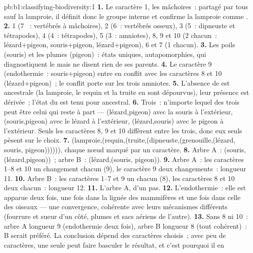 \begin{solution}{pb:b1:classifying-biodiversity:1}
\textbf{1.} Le caractère 1, les mâchoires~: partagé par tous sauf la
lamproie, il définit donc le groupe interne et confirme la lamproie
comme .
\textbf{2.} 1 (7 ~: vertébrés à mâchoires), 2 (6~: vertébrés
osseux), 3 (5~: dipneuste et tétrapodes), 4 (4~: tétrapodes), 5 (3~:
amniotes), 8, 9 et 10 (2 chacun~: lézard+pigeon, souris+pigeon,
lézard+pigeon), 6 et 7 (1 chacun).
\textbf{3.} Les poils (souris) et les plumes (pigeon)~: états uniques,
autapomorphies, qui diagnostiquent le  mais ne disent rien de ses
parents.
\textbf{4.} Le caractère 9 (endothermie~: souris+pigeon) entre en
conflit avec les caractères 8 et 10 (lézard+pigeon)~; le conflit porte
sur les trois amniotes.
\textbf{5.} L'absence de  est ancestrale (la lamproie, le requin
et la truite en sont dépourvus), leur présence est dérivée~; l'état du
 est tenu pour ancestral.
\textbf{6.} Trois~: n'importe lequel des trois peut être celui qui reste
à part --- (lézard,pigeon) avec la souris à l'extérieur,
(souris,pigeon) avec le lézard à l'extérieur, (lézard,souris) avec le
pigeon à l'extérieur. Seuls les caractères 8, 9 et 10 diffèrent entre
les trois, donc eux seuls pèsent sur le choix.
\textbf{7.} (lamproie,(requin,(truite,(dipneuste,(grenouille,(lézard,
souris, pigeon)))))), chaque nœud marqué par un caractère.
\textbf{8.} Arbre A~: (souris,(lézard,pigeon))~; arbre B~:
(lézard,(souris, pigeon)).
\textbf{9.} Arbre A~: les caractères 1--8 et 10 un changement chacun
(9), le caractère 9 deux changements~: longueur \num{11}.
\textbf{10.} Arbre B~: les caractères 1--7 et 9 un chacun (8), les
caractères 8 et 10 deux chacun~: longueur \num{12}.
\textbf{11.} L'arbre A, d'un pas.
\textbf{12.} L'endothermie~: elle est apparue deux fois, une fois dans
la lignée des mammifères et une fois dans celle des oiseaux --- une
convergence, cohérente avec leurs mécanismes différents (fourrure et
sueur d'un côté, plumes et sacs aériens de l'autre).
\textbf{13.} Sans 8 ni 10~: arbre A longueur 9 (endothermie deux fois),
arbre B longueur 8 (tout cohérent)~: B serait préféré. La conclusion
dépend des caractères choisis~; avec peu de caractères, une seule
 peut faire basculer le résultat, et c'est pourquoi il en

\end{solution}
